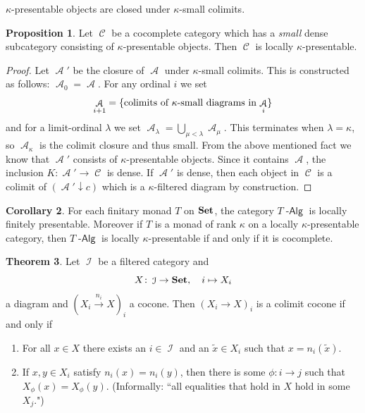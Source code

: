 \documentclass[a4paper,11pt,oneside,openany]{scrbook}
\newcommand{\catname}[1]{{\normalfont\textbf{#1}}}
\DeclareMathOperator{\Alg}{-\mathsf{Alg}}
\newcommand{\Set}{\catname{Set}}
\DeclareMathOperator{\A}{\mathcal{A}}
\DeclareMathOperator{\C}{\mathcal{C}}
\DeclareMathOperator{\I}{\mathcal{I}}
\theoremstyle{definition}
\newtheorem{thm}{Theorem}[section] %
\theoremstyle{definition}
\newtheorem{prop}[thm]{Proposition}
\newtheorem{cor}[thm]{Corollary}
\begin{document}
\begin{center}
	$\kappa$-presentable objects are closed under $\kappa$-small colimits.
\end{center}
\begin{prop}
	Let $\C$ be a cocomplete category which has a \emph{small} dense subcategory consisting of $\kappa$-presentable objects. Then $\C$ is locally $\kappa$-presentable.
\end{prop}
\begin{proof}
    Let $\A'$ be the closure of $\A $ under $ \kappa $-small  colimits.
    This is constructed as follows: $\A_0 =\A $.
    For any ordinal $ i $ we set
    \begin{displaymath}
	\A_{i+1} = \{\text{colimits of $ \kappa $-small diagrams in $\A_i $\}}
    \end{displaymath} 
    and for a limit-ordinal $ \lambda $ we set $\A_\lambda = \bigcup_{\mu<\lambda}\A_{\mu} $.
    This terminates when $ \lambda = \kappa $, so $\A_\kappa $ is the colimit closure and thus small.
    From the above mentioned fact we know that $\A'  $ consists of $ \kappa $-presentable objects.
    Since it contains $\A $, the inclusion $ K \colon\A' \to \C $ is dense.
    If $\A' $ is dense, then each object in $ \C $ is a colimit of $(\A'\downarrow c)$ which is a $ \kappa $-filtered diagram by construction.
\end{proof}
\begin{cor}
    For each finitary monad $ T $ on $ \Set $, the category $ T\Alg $ is locally finitely presentable.
    Moreover if $ T $ is a monad of rank $ \kappa $ on a locally $ \kappa $-presentable category, then $ T\Alg $ is locally $ \kappa $-presentable if and only if it is cocomplete.
\end{cor}
\begin{thm}
    Let $ \I $ be a filtered category and
    \begin{displaymath}
        X \colon \I \to\Set,\quad i \mapsto X_i
    \end{displaymath}
    a diagram and $ (X_i \xrightarrow{n_i} X)_i $ a cocone.
    Then $ (X_i \to X)_i $ is a colimit cocone if and only if
    \begin{enumerate}[label=\roman*)]
	\item For all $ x \in X $ there exists an $ i\in\I $ and an $ \tilde x \in X_i $ such that $ x = n_i (\tilde x) $.
	\item If $ x , y \in X_i $ satisfy $ n_i(x) = n_i(y) $, then there is some $ \phi \colon i\to j $ such that $ X_\phi(x) = X_\phi(y) $.
	    (Informally: ``all equalities that hold in $ X $ hold in some $ X_j $.")
    \end{enumerate}
\end{thm}
\end{document}
